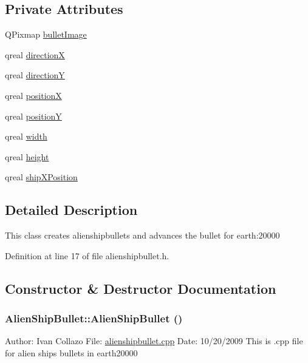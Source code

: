 \subsection*{Private Attributes}
\begin{DoxyCompactItemize}
\item 
QPixmap \hyperlink{class_alien_ship_bullet_a5a21112fe510acd6175c2c8b71af0f93}{bulletImage}
\item 
qreal \hyperlink{class_alien_ship_bullet_ac5b78fb52df900ec79a2c480410dc3ca}{directionX}
\item 
qreal \hyperlink{class_alien_ship_bullet_a807486b1f3903b772f6d31294b258edb}{directionY}
\item 
qreal \hyperlink{class_alien_ship_bullet_a961d9fe7f586e37bb06f0a1d5f6c5923}{positionX}
\item 
qreal \hyperlink{class_alien_ship_bullet_a1315cc85ceb3c3573305d78e651b1330}{positionY}
\item 
qreal \hyperlink{class_alien_ship_bullet_a08bb3094350eab416509120e76987df5}{width}
\item 
qreal \hyperlink{class_alien_ship_bullet_a6323f9356a3f49ec9d3838203f806702}{height}
\item 
qreal \hyperlink{class_alien_ship_bullet_a9fd89e42b168c49956e30a8a6f33304e}{shipXPosition}
\end{DoxyCompactItemize}


\subsection{Detailed Description}
This class creates alienshipbullets and advances the bullet for earth:20000 

Definition at line 17 of file alienshipbullet.h.

\subsection{Constructor \& Destructor Documentation}
\hypertarget{class_alien_ship_bullet_a0fa00d03540ce06da0855960709baddb}{
\subsubsection[{AlienShipBullet}]{\setlength{\rightskip}{0pt plus 5cm}AlienShipBullet::AlienShipBullet ()}}
\label{class_alien_ship_bullet_a0fa00d03540ce06da0855960709baddb}
Author: Ivan Collazo File: \hyperlink{alienshipbullet_8cpp}{alienshipbullet.cpp} Date: 10/20/2009 This is .cpp file for alien ships bullets in earth20000

